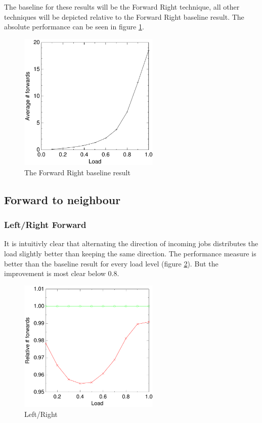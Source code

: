 \documentclass[10pt,a4paper,titlepage]{article}
\begin{document}
The baseline for these results will be the Forward Right technique, all other techniques will be depicted relative to the Forward Right baseline result. The absolute performance can be seen in figure \ref{baseline}.

\begin{figure}[h!tb]
\centering
\includegraphics[width=0.6\textwidth]{data/right.pdf}
\caption{The Forward Right baseline result}
\label{baseline}
\end{figure}

\subsection{Forward to neighbour}

\subsubsection{Left/Right Forward}
It is intuitivly clear that alternating the direction of incoming jobs distributes the load slightly better than keeping the same direction. The performance measure is better than the baseline result for every load level (figure \ref{figlr}). But the improvement is most clear below $0.8$.

\begin{figure}[h!tb]
\centering
\includegraphics[width=0.6\textwidth]{data/switchright.pdf}
\caption{Left/Right}
\label{figlr}
\end{figure}
\end{document}
